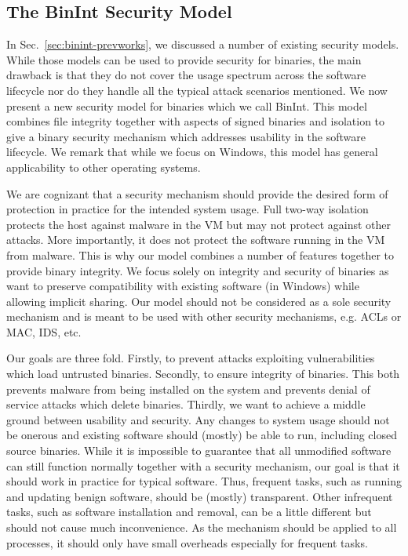 \subsection{The BinInt Security Model}
\label{sec:binint-model}

In Sec.~\ref{sec:binint-prevworks}, we discussed a number of existing
security models. While those models can be used to provide security
for binaries, the main drawback is that they do not cover the usage spectrum
across the software lifecycle nor do they handle all the
typical attack scenarios mentioned.
We now present a new security model for binaries
which we call BinInt.
This model combines file integrity together with
aspects of signed binaries and isolation to give a binary
security mechanism which 
addresses usability in the software lifecycle. We remark
that while we focus on Windows, this model has general applicability
to other operating systems.

We are cognizant that a security mechanism
should provide the desired form of protection in practice for
the intended system usage.
Full two-way isolation protects the host
against malware in the VM but may not
protect against other attacks.
More importantly, it does not protect the software running 
in the VM from malware.
This is why our model combines a number of features together to provide
binary integrity. 
We focus solely on integrity and security of binaries
as want to preserve compatibility with existing
software (in Windows) while allowing implicit sharing.
Our model should not be considered as a sole security mechanism and
is meant to be used with other security mechanisms, 
e.g. ACLs or MAC, IDS, etc.

Our goals are three fold.
Firstly, to prevent attacks exploiting vulnerabilities which load 
untrusted binaries.
Secondly, to ensure integrity of binaries.
This both prevents malware from being installed on the system and 
prevents denial of service attacks which delete binaries.
Thirdly, we want to achieve a middle ground
between usability and security.
Any changes to system usage should not be onerous and existing software 
should (mostly) be able to run, including closed source binaries.
While it is impossible to guarantee that all unmodified software can still
function normally together with a security mechanism, our goal is that
it should work in practice for typical software.
Thus, frequent tasks, such as running and updating benign software, 
should be (mostly) transparent.
Other infrequent tasks, such as software installation and removal, 
can be a little different but should not cause much inconvenience.
As the mechanism should be applied to all processes, 
it should only have small overheads especially for frequent tasks.

